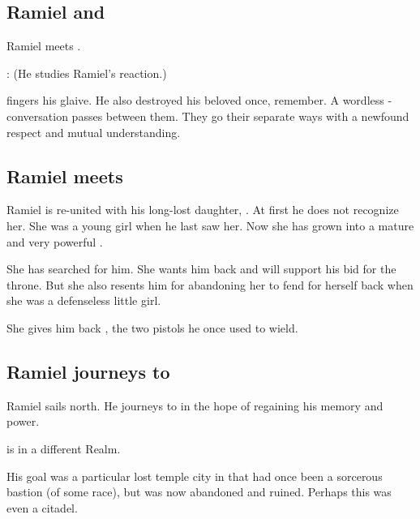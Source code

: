 \subsection{Ramiel and \Ishnaruchaefir}
Ramiel meets \Ishnaruchaefir. 

\begin{prose}
  \Ishnaruchaefir:
  (He studies Ramiel's reaction.)
  
  \Ishnaruchaefir{} fingers his glaive.
  He also destroyed his beloved once, remember. 
  A wordless -conversation passes between them. 
  They go their separate ways with a newfound respect and mutual understanding. 
\end{prose}









\subsection{Ramiel meets \Cishiel}
Ramiel is re-united with his long-lost daughter, . 
At first he does not recognize her. 
She was a young girl when he last saw her.
Now she has grown into a mature and very powerful \resvil. 

She has searched for him. 
She wants him back and will support his bid for the throne. 
But she also resents him for abandoning her to fend for herself back when she was a defenseless little girl. 

She gives him back , the two pistols he once used to wield. 









\subsection{Ramiel journeys to \UltimaThule}
Ramiel sails north. 
He journeys to  in the hope of regaining his memory and power. 

\UltimaThule is in a different Realm. 

His goal was a particular lost temple city in \UltimaThule that had once been a sorcerous bastion (of some race), but was now abandoned and ruined.
Perhaps this was even a \voyager citadel.

